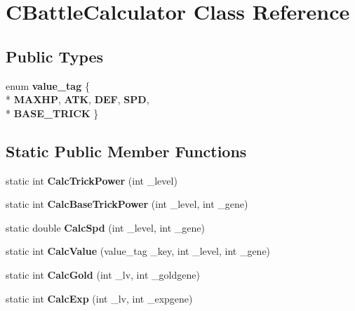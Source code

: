 \hypertarget{class_c_battle_calculator}{}\section{C\+Battle\+Calculator Class Reference}
\label{class_c_battle_calculator}
\subsection*{Public Types}
\begin{DoxyCompactItemize}
\item 
enum {\bfseries value\+\_\+tag} \{ \\*
{\bfseries M\+A\+X\+HP}, 
{\bfseries A\+TK}, 
{\bfseries D\+EF}, 
{\bfseries S\+PD}, 
\\*
{\bfseries B\+A\+S\+E\+\_\+\+T\+R\+I\+CK}
 \}\hypertarget{class_c_battle_calculator_a6b79d0c94bc9fa32455c55d3a77500f9}{}\label{class_c_battle_calculator_a6b79d0c94bc9fa32455c55d3a77500f9}

\end{DoxyCompactItemize}
\subsection*{Static Public Member Functions}
\begin{DoxyCompactItemize}
\item 
static int {\bfseries Calc\+Trick\+Power} (int \+\_\+level)\hypertarget{class_c_battle_calculator_a80fb5d1a3b5d6ef9ced10481ffc1c87b}{}\label{class_c_battle_calculator_a80fb5d1a3b5d6ef9ced10481ffc1c87b}

\item 
static int {\bfseries Calc\+Base\+Trick\+Power} (int \+\_\+level, int \+\_\+gene)\hypertarget{class_c_battle_calculator_a7e85a846ac58e950ce5df17bf36691c2}{}\label{class_c_battle_calculator_a7e85a846ac58e950ce5df17bf36691c2}

\item 
static double {\bfseries Calc\+Spd} (int \+\_\+level, int \+\_\+gene)\hypertarget{class_c_battle_calculator_a6e4dc10111d25e7b4c114d8d21c865cd}{}\label{class_c_battle_calculator_a6e4dc10111d25e7b4c114d8d21c865cd}

\item 
static int {\bfseries Calc\+Value} (value\+\_\+tag \+\_\+key, int \+\_\+level, int \+\_\+gene)\hypertarget{class_c_battle_calculator_a740a5e4e35e67858eac286c7c42a0e98}{}\label{class_c_battle_calculator_a740a5e4e35e67858eac286c7c42a0e98}

\item 
static int {\bfseries Calc\+Gold} (int \+\_\+lv, int \+\_\+goldgene)\hypertarget{class_c_battle_calculator_ac614df8377f4426788a92f18f29a60c6}{}\label{class_c_battle_calculator_ac614df8377f4426788a92f18f29a60c6}

\item 
static int {\bfseries Calc\+Exp} (int \+\_\+lv, int \+\_\+expgene)\hypertarget{class_c_battle_calculator_aeb13adffa99b8676938e03bf78b37676}{}\label{class_c_battle_calculator_aeb13adffa99b8676938e03bf78b37676}

\end{DoxyCompactItemize}


